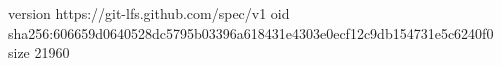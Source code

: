 version https://git-lfs.github.com/spec/v1
oid sha256:606659d0640528dc5795b03396a618431e4303e0ecf12c9db154731e5c6240f0
size 21960
